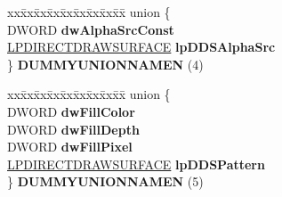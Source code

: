 \begin{DoxyCompactItemize}
\begin{tabbing}
\end{tabbing}\item 
\mbox{\label{struct___d_d_b_l_t_f_x_aaed08a0601d40cd47c08d71f587bc1d5}} 
\begin{tabbing}
xx\=xx\=xx\=xx\=xx\=xx\=xx\=xx\=xx\=\kill
union \{\\
\>DWORD {\bfseries dwAlphaSrcConst}\\
\>\hyperlink{interfacevoid}{LPDIRECTDRAWSURFACE} {\bfseries lpDDSAlphaSrc}\\
\} {\bfseries DUMMYUNIONNAMEN} (4)\\

\end{tabbing}\item 
\mbox{\label{struct___d_d_b_l_t_f_x_acc0144f1ff8c3499ec477c041685c03f}} 
\begin{tabbing}
xx\=xx\=xx\=xx\=xx\=xx\=xx\=xx\=xx\=\kill
union \{\\
\>DWORD {\bfseries dwFillColor}\\
\>DWORD {\bfseries dwFillDepth}\\
\>DWORD {\bfseries dwFillPixel}\\
\>\hyperlink{interfacevoid}{LPDIRECTDRAWSURFACE} {\bfseries lpDDSPattern}\\
\} {\bfseries DUMMYUNIONNAMEN} (5)\\

\end{tabbing}\end{DoxyCompactItemize}
